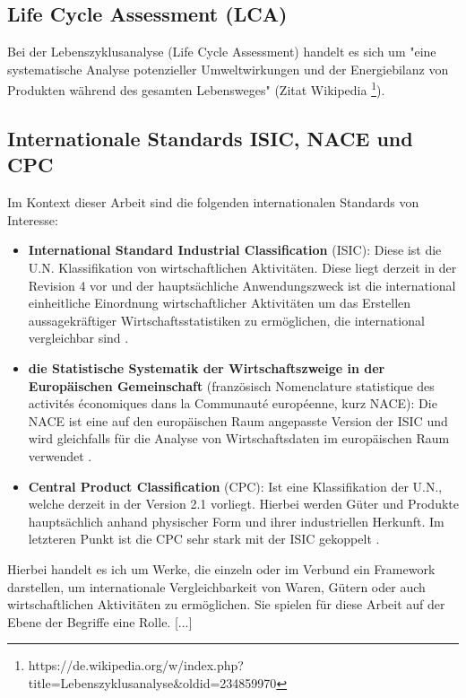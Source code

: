 \documentclass{article}
\begin{document}
\subsection{Life Cycle Assessment (LCA)}

Bei der Lebenszyklusanalyse (Life Cycle Assessment) handelt es sich um "eine systematische Analyse potenzieller Umweltwirkungen und der Energiebilanz von Produkten während des gesamten Lebensweges" (Zitat Wikipedia \footnote{https://de.wikipedia.org/w/index.php?title=Lebenszyklusanalyse\&oldid=234859970}).

\subsection{Internationale Standards ISIC, NACE und CPC}

Im Kontext dieser Arbeit sind die folgenden internationalen Standards von Interesse:

\begin{itemize}
    \item \textbf{International Standard Industrial Classification} (ISIC): Diese ist die U.N. Klassifikation von wirtschaftlichen Aktivitäten. Diese liegt derzeit in der Revision 4 vor und der hauptsächliche Anwendungszweck ist die international einheitliche Einordnung wirtschaftlicher Aktivitäten um das Erstellen aussagekräftiger Wirtschaftsstatistiken zu ermöglichen, die international vergleichbar sind \cite{UNSDISIC}.
    \item \textbf{die Statistische Systematik der Wirtschaftszweige in der Europäischen Gemeinschaft} (französisch Nomenclature statistique des activités économiques dans la Communauté européenne, kurz NACE): Die NACE ist eine auf den europäischen Raum angepasste Version der ISIC und wird gleichfalls für die Analyse von Wirtschaftsdaten im europäischen Raum verwendet \cite{EurostatNACE}.
    \item \textbf{Central Product Classification} (CPC): Ist eine Klassifikation der U.N., welche derzeit in der Version 2.1 vorliegt. Hierbei werden Güter und Produkte hauptsächlich anhand physischer Form und ihrer industriellen Herkunft. Im letzteren Punkt ist die CPC sehr stark mit der ISIC gekoppelt \cite{UNSDCPCv21}.
\end{itemize}

Hierbei handelt es ich um Werke, die einzeln oder im Verbund ein Framework darstellen, um internationale Vergleichbarkeit von Waren, Gütern oder auch wirtschaftlichen Aktivitäten zu ermöglichen. Sie spielen für diese Arbeit auf der Ebene der Begriffe eine Rolle. [...]
\end{document}
